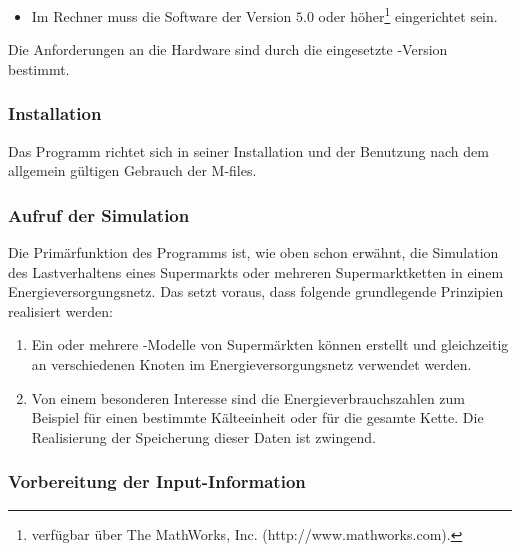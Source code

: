 \begin{itemize}
	\item Im Rechner muss die Software \matlab der Version $5.0$ oder
	höher\footnote{ \matlab verfügbar über The MathWorks, Inc.
	(http://www.mathworks.com).} eingerichtet sein.
\end{itemize}

Die Anforderungen an die Hardware sind durch die eingesetzte \matlab-Version
bestimmt.

\subsubsection{Installation}

Das Programm richtet sich in seiner Installation und der Benutzung nach dem
allgemein gültigen Gebrauch der \matlab M-files.

\subsubsection{Aufruf der Simulation}%

Die Primärfunktion des Programms ist, wie oben schon erwähnt, die Simulation des
Lastverhaltens eines Supermarkts oder mehreren Supermarktketten in einem
Energieversorgungsnetz. Das setzt voraus, dass folgende grundlegende Prinzipien
realisiert werden:
\begin{enumerate}
	\item Ein oder mehrere \matlab-Modelle von Supermärkten können erstellt
	und gleichzeitig an verschiedenen Knoten im Energieversorgungsnetz
	verwendet werden.
	\item Von einem besonderen Interesse sind die Energieverbrauchszahlen
	zum Beispiel für einen bestimmte Kälteeinheit oder für die gesamte
	Kette. Die Realisierung der Speicherung dieser Daten ist zwingend.
\end{enumerate}

\subsubsection*{Vorbereitung der Input-Information}
\label{sec:input_infos}

